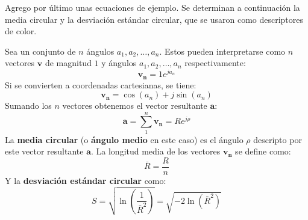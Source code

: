 \pagebreak

Agrego por último unas ecuaciones de ejemplo. Se determinan a continuación la media circular y la desviación estándar circular, que se usaron como descriptores de color.~\autocite{estcirc}

Sea un conjunto de $ n $ ángulos $ a_1, a_2, \dots, a_n $. Estos pueden interpretarse como $ n $ vectores $ \bm{v} $ de magnitud $ 1 $ y ángulos $ a_1, a_2, \dots, a_n $ respectivamente:
%
\begin{equation} \bm{v_n} = 1 e^{j a_n} \end{equation}
%
Si se convierten a coordenadas cartesianas, se tiene:
%
\begin{equation} \bm{v_n} = \cos(a_n) + j \sin(a_n) \end{equation}
%
Sumando los $ n $ vectores obtenemos el vector resultante $ \bm{a} $:
%
\begin{equation} \bm{a} = \sum_{1}^{n} \bm{v_n} = R e^{j \rho} \end{equation}
%
La \textbf{media circular} (o \textbf{ángulo medio} en este caso) es el ángulo $ \rho $ descripto por este vector resultante $ \bm{a} $.
%
La longitud media de los vectores $ \bm{v_n} $ se define como:
%
\begin{equation} \bar{R} = \frac{R}{n} \end{equation}
%
Y la \textbf{desviación estándar circular} como:
%
\begin{equation} S = \sqrt{\ln\left(\frac{1}{\bar{R}^2}\right)} = \sqrt{-2 \ln \left( \bar{R}^2 \right) } \end{equation}